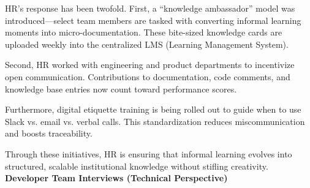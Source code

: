 \documentclass[12pt,a4paper,oneside]{book}
\begin{document}
HR’s response has been twofold. First, a “knowledge ambassador” model was introduced—select team members are tasked with converting informal learning moments into micro-documentation. These bite-sized knowledge cards are uploaded weekly into the centralized LMS (Learning Management System).

Second, HR worked with engineering and product departments to incentivize open communication. Contributions to documentation, code comments, and knowledge base entries now count toward performance scores.

Furthermore, digital etiquette training is being rolled out to guide when to use Slack vs. email vs. verbal calls. This standardization reduces miscommunication and boosts traceability.

Through these initiatives, HR is ensuring that informal learning evolves into structured, scalable institutional knowledge without stifling creativity.\\


\textbf{Developer Team Interviews (Technical Perspective)}\\
\end{document}
